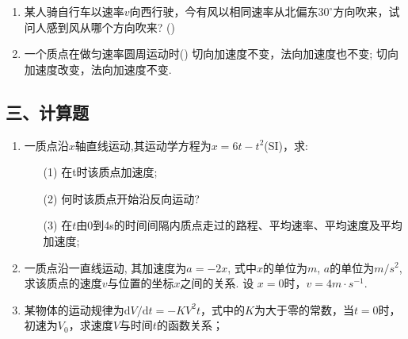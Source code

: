 \begin{enumerate}
    \item 某人骑自行车以速率$v$向西行驶，今有风以相同速率从北偏东$30^\circ$方向吹来，试问人感到风从哪个方向吹来? (\hspace{1pc})
    \item 一个质点在做匀速率圆周运动时(\hspace{1pc})
    {切向加速度不变，法向加速度也不变; }{切向加速度改变，法向加速度不变. }

\end{enumerate}

\subsection*{三、计算题}
\begin{enumerate}
    \item 一质点沿$x$轴直线运动,其运动学方程为$x=6t-t^2$(SI)，求:
    \begin{enumerate}
        \item[(1)] 在t时该质点加速度;
        \item[(2)] 何时该质点开始沿反向运动?
        \item[(3)] 在$t$由0到4s的时间间隔内质点走过的路程、平均速率、平均速度及平均加速度;
    \end{enumerate}
    \item 一质点沿一直线运动, 其加速度为$a=-2x$, 式中$x$的单位为$m$, $a$的单位为$m/s^2$, 
    求该质点的速度$v$与位置的坐标$x$之间的关系. 设 $x=0$时，$v=4m\cdot s^{-1}$.
    \item  某物体的运动规律为$\mathrm{d}V/\mathrm{d}t=-KV^2t$，式中的$K$为大于零的常数，当$t=0$时，初速为$V_0$，求速度$V$与时间$t$的函数关系；
\end{enumerate}

